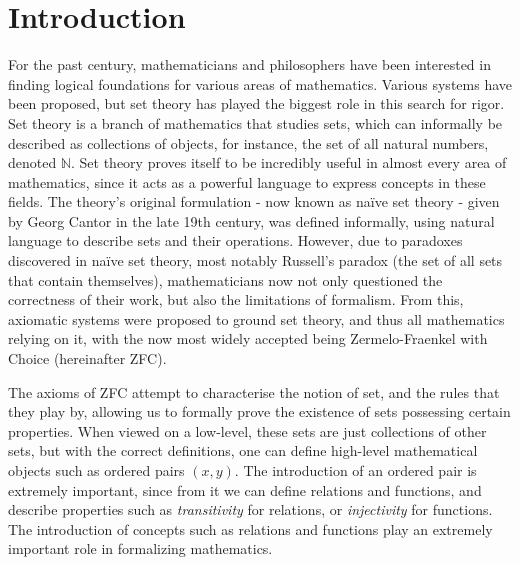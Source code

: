 \documentclass[12pt]{article}
\theoremstyle{definition}
\begin{document}
\section{Introduction}
For the past century, mathematicians and philosophers have been interested in finding logical foundations for various areas of mathematics. Various systems have been proposed, but set theory has played the biggest role in this search for rigor.
Set theory is a branch of mathematics that studies sets, which can informally be described as collections of objects, for instance, the set of all natural numbers, denoted $\mathbb{N}$.
Set theory proves itself to be incredibly useful in almost every area of mathematics, since it acts as a powerful language to express concepts in these fields.
The theory's original formulation - now known as na\"ive set theory - given by Georg Cantor in the late 19th century, was defined informally, using natural language to describe sets and their operations.
However, due to paradoxes discovered in na\"ive set theory, most notably Russell's paradox (the set of all sets that contain themselves), mathematicians now not only questioned the correctness of their work, but also the limitations of formalism.
From this, axiomatic systems were proposed to ground set theory, and thus all mathematics relying on it, with the now most widely accepted being Zermelo-Fraenkel with Choice (hereinafter ZFC).

The axioms of ZFC attempt to characterise the notion of set, and the rules that they play by, allowing us to formally prove the existence of sets possessing certain properties.
When viewed on a low-level, these sets are just collections of other sets, but with the correct definitions, one can define high-level mathematical objects such as ordered pairs $(x,y)$.
The introduction of an ordered pair is extremely important, since from it we can define relations and functions, and describe properties such as \emph{transitivity} for relations, or \emph{injectivity} for functions.
The introduction of concepts such as relations and functions play an extremely important role in formalizing mathematics.
\end{document}
